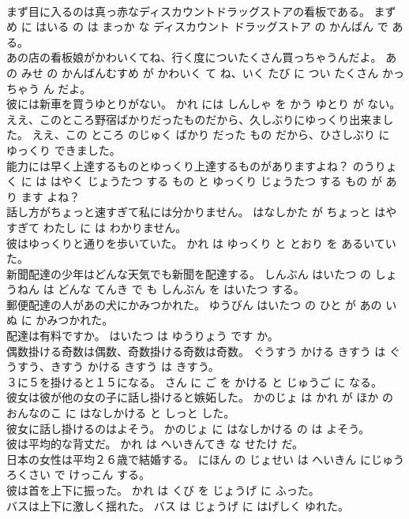 \documentclass[8pt]{extreport}
\begin{document}
\begin{CJK}{UTF8}{min}
\\	まず目に入るのは真っ赤なディスカウントドラッグストアの看板である。	まず め に はいる の は まっか な ディスカウント ドラッグストア の かんばん で ある。	
\\	あの店の看板娘がかわいくてね、行く度についたくさん買っちゃうんだよ。	あの みせ の かんばんむすめ が かわいく て ね、いく たび に つい たくさん かっちゃう ん だよ。	
\\	彼には新車を買うゆとりがない。	かれ には しんしゃ を かう ゆとり が ない。	
\\	ええ、このところ野宿ばかりだったものだから、久しぶりにゆっくり出来ました。	ええ、この ところ のじゅく ばかり だった もの だから、ひさしぶり に ゆっくり できました。	
\\	能力には早く上達するものとゆっくり上達するものがありますよね？	のうりょく に は はやく じょうたつ する もの と ゆっくり じょうたつ する もの が あり ます よね？	
\\	話し方がちょっと速すぎて私には分かりません。	はなしかた が ちょっと はやすぎて わたし に は わかりません。	
\\	彼はゆっくりと通りを歩いていた。	かれ は ゆっくり と とおり を あるいていた。	
\\	新聞配達の少年はどんな天気でも新聞を配達する。	しんぶん はいたつ の しょうねん は どんな てんき で も しんぶん を はいたつ する。	
\\	郵便配達の人があの犬にかみつかれた。	ゆうびん はいたつ の ひと が あの いぬ に かみつかれた。	
\\	配達は有料ですか。	はいたつ は ゆうりょう です か。	
\\	偶数掛ける奇数は偶数、奇数掛ける奇数は奇数。	ぐうすう かける きすう は ぐうすう、きすう かける きすう は きすう。	
\\	３に５を掛けると１５になる。	さん に ご を かける と じゅうご に なる。	
\\	彼女は彼が他の女の子に話し掛けると嫉妬した。	かのじょ は かれ が ほか の おんなのこ に はなしかける と しっと した。	
\\	彼女に話し掛けるのはよそう。	かのじょ に はなしかける の は よそう。	
\\	彼は平均的な背丈だ。	かれ は へいきんてき な せたけ だ。	
\\	日本の女性は平均２６歳で結婚する。	にほん の じょせい は へいきん にじゅうろくさい で けっこん する。	
\\	彼は首を上下に振った。	かれ は くび を じょうげ に ふった。	
\\	バスは上下に激しく揺れた。	バス は じょうげ に はげしく ゆれた。	

\end{CJK}
\end{document}
